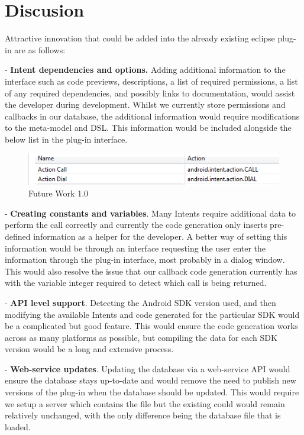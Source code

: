 \section{Discusion}
\label{Discusion}

Attractive innovation that could be added into the already existing eclipse plug-in are as follows:

- \textbf{Intent dependencies and options.} Adding additional information to the interface such as code previews, descriptions, a list of required permissions, a list of any required dependencies, and possibly links to documentation, would assist the developer during development. Whilst we currently store permissions and callbacks in our database, the additional information would require modifications to the meta-model and DSL. This information would be included alongside the below list in the plug-in interface.

\begin{figure}[H]
\label{codegeneratorview}
  \centering
    \includegraphics[width=\textwidth]{intentBefore}
  \caption{Future Work 1.0}
\end{figure}

- \textbf{Creating constants and variables}. Many Intents require additional data to perform the call correctly and currently the code generation only inserts pre-defined information as a helper for the developer. A better way of setting this information would be through an interface requesting the user enter the information through the plug-in interface, most probably in a dialog window. This would also resolve the issue that our callback code generation currently has with the variable integer required to detect which call is being returned.

- \textbf{API level support}. Detecting the Android SDK version used, and then modifying the available Intents and code generated for the particular SDK would be a complicated but good feature. This would ensure the code generation works across as many platforms as possible, but compiling the data for each SDK version would be a long and extensive process.

- \textbf{Web-service updates}. Updating the database via a web-service API would ensure the database stays up-to-date and would remove the need to publish new versions of the plug-in when the database should be updated. This would require we setup a server which contains the file but the existing could would remain relatively unchanged, with the only difference being the database file that is loaded.
	